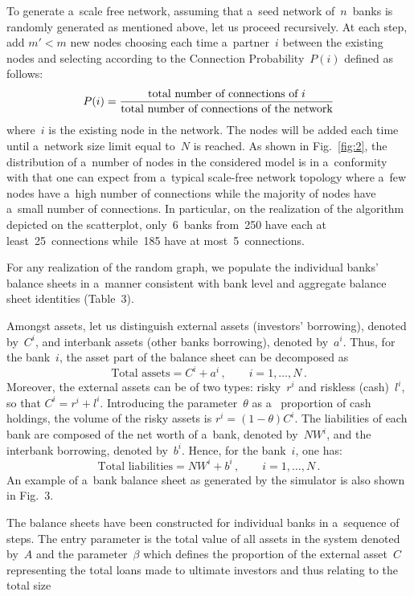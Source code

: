 \begin{multicols}{2}
To generate a~scale free network, assuming that a~seed network of~$n$~banks is 
randomly generated as mentioned above, let us proceed recursively. At each step,  
add  $m'<m$ new nodes choosing each time a~partner~$i$ between the  existing 
nodes and selecting according to the  Connection Probability~$P(i)$ defined as 
follows: 
$$
P(i ) = \fr{\mbox{total\ number\ of\ connections\ of\ $i$}}{\mbox{total\ number\ of\ 
connections\ of\ the\ network}}
$$ 
where~$i$ is the existing node in the network. The nodes will be added each time 
until  a~network size limit  equal to~$N$ is reached. As shown in Fig.~\ref{fig:2},  
the 
distribution of a~number of nodes in the considered model is in a~conformity with that one 
can expect from   a~typical scale-free network topology where a~few nodes have 
a~high number of connections while the majority of nodes have a~small number of 
connections. In particular, 
on the realization of the algorithm depicted on the scatterplot, only~6~banks 
from~250 have each at least~25~connections while~185 have at most~5~connections.  




For any realization of the random graph, we populate the individual banks' 
balance sheets in a~manner consistent with bank level and aggregate balance 
sheet identities (Table~3).
 


Amongst assets, let us distinguish  external assets (investors' borrowing), denoted 
by~$C^i$, and interbank assets (other banks borrowing), denoted by~$a^i$. Thus, 
for the bank~$i$,  the asset part of the balance sheet  can be decomposed as  
$$
\mbox{Total\ assets} = C^i + a^i\,, \qquad i = 1,\ldots,N\,.
$$ 
Moreover, the external assets can be of two types: risky~$r^i$ and riskless 
(cash)~$l^i$, so that   $C^i=r^i+l^i$.  Introducing the parameter~$\theta$ as a~
proportion of cash holdings, the volume of the risky assets is $r^i = (1- 
\theta) C^i$.  
The liabilities of each bank  are composed of the net worth of a~bank, denoted 
by~$NW^i$, and the interbank borrowing, denoted by~$b^i$. Hence, for the bank~$i$, 
one has:  
$$
\mbox{Total\ liabilities}= NW^i + b^i\,, \qquad i = 1,\ldots,N\,.
$$ 
An example of a~bank balance sheet as generated by the simulator is also shown 
in Fig.~3.  

    

The balance sheets have been constructed for individual banks in a~sequence  of steps.
The entry parameter is the total value of all assets in the system denoted 
by~$A$ and the parameter~$\beta$ which defines the proportion of the external 
asset~$C$ representing the total loans made to ultimate investors and thus 
relating to the total size\linebreak\vspace*{-12pt}


\end{multicols}
